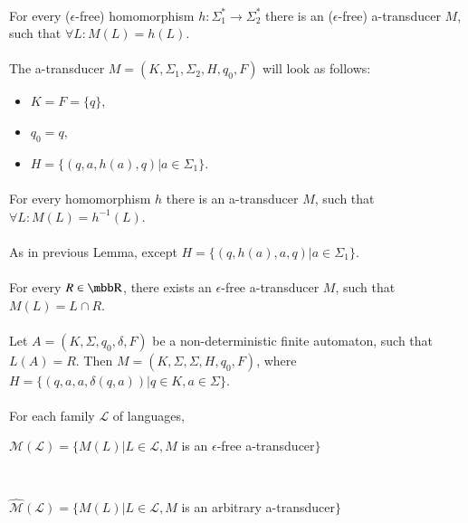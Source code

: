 \paragraph{}
\clema For every ($\epsilon $-free) homomorphism $h: \Sigma_{1}^{*} \rightarrow \Sigma_{2}^{*}$ there is an ($\epsilon $-free) a-transducer $M$, such that $\forall L: M(L) = h(L)$.

\paragraph{}
\dokaz The a-transducer $M=(K, \Sigma_{1}, \Sigma_{2}, H, q_{0}, F)$ will look as follows:
\begin{itemize}
\item $K = F = \{ q \}$,
\item $q_{0} = q$,
\item $H = \{ (q, a, h(a), q) | a \in \Sigma_{1} \}$. \square
\end{itemize}

\paragraph{}
\clema For every homomorphism $h$ there is an a-transducer $M$, such that $\forall L: M(L) = h^{-1}(L)$.

\paragraph{}
\dokaz As in previous Lemma, except $H = \{ (q, h(a), a, q) | a \in \Sigma_{1} \}$. \square

\paragraph{}
\clema For every $R \in \R $, there exists an $\epsilon $-free a-transducer $M$, such that $M(L) = L \cap R$.

\paragraph{}
\dokaz Let $A = (K, \Sigma, q_{0}, \delta, F)$ be a non-deterministic finite automaton, such that $L(A) = R$. Then $M=(K, \Sigma, \Sigma, H, q_{0}, F)$, where $H=\{ (q, a, a, \delta (q,a)) | q \in K, a \in \Sigma \} $. \square

\paragraph{}
\oznacenie For each family $\mathcal{L} $ of languages, \\
\centerline{$\mathcal{M(L)} = \{ M(L) | L \in \mathcal{L}, M$ is an $\epsilon $-free a-transducer$\} $} \\
\centerline{$\mathcal{\hat{M}(L)} = \{ M(L) | L \in \mathcal{L}, M$ is an arbitrary a-transducer$\} $}

